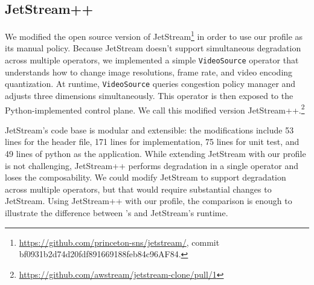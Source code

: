\subsection{JetStream++}
\label{sub:jetstream++}

We modified the open source version of
JetStream\footnote{\url{https://github.com/princeton-sns/jetstream/}, \newline
  commit bf0931b2d74d20fdf891669188feb84c96AF84.} in order to use our profile as
its manual policy. Because JetStream doesn't support simultaneous degradation
across multiple operators, we implemented a simple \texttt{VideoSource} operator
that understands how to change image resolutions, frame rate, and video encoding
quantization. At runtime, \texttt{VideoSource} queries congestion policy manager
and adjusts three dimensions simultaneously. This operator is then exposed to
the Python-implemented control plane. We call this modified version
JetStream++.\footnote{\url{https://github.com/awstream/jetstream-clone/pull/1}}

JetStream's code base is modular and extensible: the modifications include 53
lines for the header file, 171 lines for implementation, 75 lines for unit test,
and 49 lines of python as the application. While extending JetStream with our
profile is not challenging, JetStream++ performs degradation in a single
operator and loses the composability. We could modify JetStream to support
degradation across multiple operators, but that would require substantial
changes to JetStream. Using JetStream++ with our profile, the comparison is
enough to illustrate the difference between \awstream{}'s and JetStream's
runtime.


